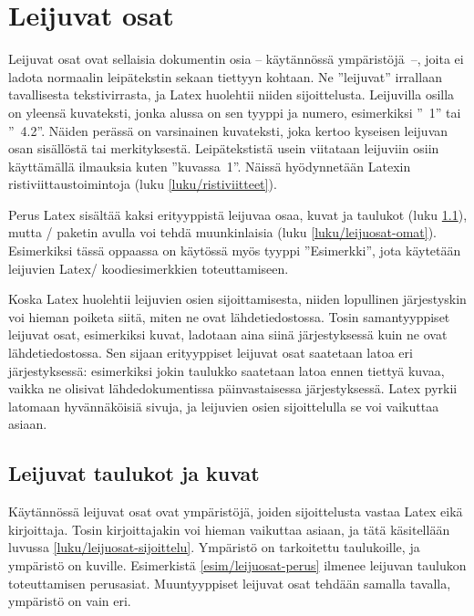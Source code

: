 \section{Leijuvat osat}
\label{luku/leijuosat}

Leijuvat osat ovat sellaisia dokumentin osia -- käytännössä
ympäristöjä~--, joita ei ladota normaalin leipätekstin sekaan tiettyyn
kohtaan. Ne ''leijuvat'' irrallaan tavallisesta tekstivirrasta, ja Latex
huolehtii niiden sijoittelusta. Leijuvilla osilla on yleensä kuvateksti,
jonka alussa on sen tyyppi ja numero, esimerkiksi ''\figurename~1'' tai
''\tablename\ 4.2''. Näiden perässä on varsinainen kuvateksti, joka
kertoo kyseisen leijuvan osan sisällöstä tai merkityksestä.
Leipätekstistä usein viitataan leijuviin osiin käyttämällä ilmauksia
kuten ''kuvassa~1''. Näissä hyödynnetään Latexin ristiviittaustoimintoja
(luku \ref{luku/ristiviitteet}).

Perus Latex sisältää kaksi erityyppistä leijuvaa osaa, kuvat ja taulukot
(luku \ref{luku/leijuosat-latex}), mutta \-/ paketin
avulla voi tehdä muunkinlaisia (luku \ref{luku/leijuosat-omat}).
Esimerkiksi tässä oppaassa on käytössä myös tyyppi ''Esimerkki'', jota
käytetään leijuvien Latex\-/ koodiesimerkkien toteuttamiseen.

Koska Latex huolehtii leijuvien osien sijoittamisesta, niiden lopullinen
järjestyskin voi hieman poiketa siitä, miten ne ovat lähdetiedostossa.
Tosin samantyyppiset leijuvat osat, esimerkiksi kuvat, ladotaan aina
siinä järjestyksessä kuin ne ovat lähdetiedostossa. Sen sijaan
erityyppiset leijuvat osat saatetaan latoa eri järjestyksessä:
esimerkiksi jokin taulukko saatetaan latoa ennen tiettyä kuvaa, vaikka
ne olisivat lähdedokumentissa päinvastaisessa järjestyksessä. Latex
pyrkii latomaan hyvännäköisiä sivuja, ja leijuvien osien sijoittelulla
se voi vaikuttaa asiaan.

\subsection{Leijuvat taulukot ja kuvat}
\label{luku/leijuosat-latex}

Käytännössä leijuvat osat ovat ympäristöjä, joiden sijoittelusta vastaa
Latex eikä kirjoittaja. Tosin kirjoittajakin voi hieman vaikuttaa
asiaan, ja tätä käsitellään luvussa \ref{luku/leijuosat-sijoittelu}.
Ympäristö  on tarkoitettu taulukoille, ja ympäristö
 on kuville. Esimerkistä \ref{esim/leijuosat-perus}
ilmenee leijuvan taulukon toteuttamisen perusasiat. Muuntyyppiset
leijuvat osat tehdään samalla tavalla, ympäristö on vain eri.

